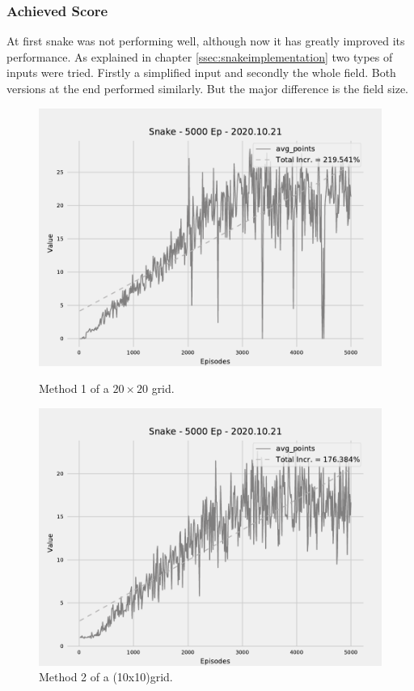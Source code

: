 \documentclass[12pt]{article}
\begin{document}
\subsubsection{Achieved Score}
At first snake was not performing well, although now it has greatly improved its performance. As explained in chapter \ref{ssec:snakeimplementation} two types of inputs were tried. Firstly a simplified input and secondly the whole field. Both versions at the end performed similarly. But the major difference is the field size. 
\begin{figure}
  \vspace{-20pt}
  \begin{center}
\includegraphics[scale=0.4]{pictures/fig.Snake - 5000 Ep - 2020.10.21 (20x20).pdf}
\end{center}
  \vspace{-20pt}
  \caption{Method 1 of a $20{\times}20$ grid.}
  \vspace{-10pt}
    \label{fig:snake_method1}
      \begin{center}
\includegraphics[scale=0.4]{pictures/fig.Snake - 5000 Ep - 2020.10.21 (10x10).pdf}
\end{center}
  \vspace{-20pt}
  \caption{Method 2 of a (10x10)grid.}
  \vspace{-10pt}
    \label{fig:snake_method2}
\end{figure}
\end{document}
